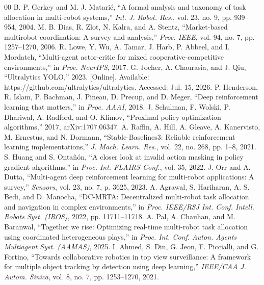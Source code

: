 \documentclass[conference]{IEEEtran}
\begin{document}
\begin{thebibliography}{00}
 B. P. Gerkey and M. J. Matarić, ``A formal analysis and taxonomy of task allocation in multi-robot systems,'' \textit{Int. J. Robot. Res.}, vol. 23, no. 9, pp. 939--954, 2004.
 M. B. Dias, R. Zlot, N. Kalra, and A. Stentz, ``Market-based multirobot coordination: A survey and analysis,'' \textit{Proc. IEEE}, vol. 94, no. 7, pp. 1257--1270, 2006.
 R. Lowe, Y. Wu, A. Tamar, J. Harb, P. Abbeel, and I. Mordatch, ``Multi-agent actor-critic for mixed cooperative-competitive environments,'' in \textit{Proc. NeurIPS}, 2017.
 G. Jocher, A. Chaurasia, and J. Qiu, ``Ultralytics YOLO,'' 2023. [Online]. Available: https://github.com/ultralytics/ultralytics. Accessed: Jul. 15, 2026.
 P. Henderson, R. Islam, P. Bachman, J. Pineau, D. Precup, and D. Meger, ``Deep reinforcement learning that matters,'' in \textit{Proc. AAAI}, 2018.
 J. Schulman, F. Wolski, P. Dhariwal, A. Radford, and O. Klimov, ``Proximal policy optimization algorithms,'' 2017, arXiv:1707.06347.
 A. Raffin, A. Hill, A. Gleave, A. Kanervisto, M. Ernestus, and N. Dormann, ``Stable-Baselines3: Reliable reinforcement learning implementations,'' \textit{J. Mach. Learn. Res.}, vol. 22, no. 268, pp. 1--8, 2021.
 S. Huang and S. Ontañón, ``A closer look at invalid action masking in policy gradient algorithms,'' in \textit{Proc. Int. FLAIRS Conf.}, vol. 35, 2022.
 J. Orr and A. Dutta, ``Multi-agent deep reinforcement learning for multi-robot applications: A survey,'' \textit{Sensors}, vol. 23, no. 7, p. 3625, 2023.
 A. Agrawal, S. Hariharan, A. S. Bedi, and D. Manocha, ``DC-MRTA: Decentralized multi-robot task allocation and navigation in complex environments,'' in \textit{Proc. IEEE/RSJ Int. Conf. Intell. Robots Syst. (IROS)}, 2022, pp. 11711--11718.
 A. Pal, A. Chauhan, and M. Baranwal, ``Together we rise: Optimizing real-time multi-robot task allocation using coordinated heterogeneous plays,'' in \textit{Proc. Int. Conf. Auton. Agents Multiagent Syst. (AAMAS)}, 2025.
 I. Ahmed, S. Din, G. Jeon, F. Piccialli, and G. Fortino, ``Towards collaborative robotics in top view surveillance: A framework for multiple object tracking by detection using deep learning,'' \textit{IEEE/CAA J. Autom. Sinica}, vol. 8, no. 7, pp. 1253--1270, 2021.
\end{thebibliography}
\end{document}
